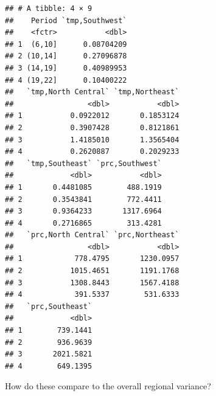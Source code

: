 \documentclass[11pt,]{tufte-handout}
\begin{document}
\begin{verbatim}
## # A tibble: 4 × 9
##    Period `tmp,Southwest`
##    <fctr>           <dbl>
## 1  (6,10]      0.08704209
## 2 (10,14]      0.27096878
## 3 (14,19]      0.40989953
## 4 (19,22]      0.10400222
##   `tmp,North Central` `tmp,Northeast`
##                 <dbl>           <dbl>
## 1           0.0922012       0.1853124
## 2           0.3907428       0.8121861
## 3           1.4185010       1.3565404
## 4           0.2620887       0.2029233
##   `tmp,Southeast` `prc,Southwest`
##             <dbl>           <dbl>
## 1       0.4481085        488.1919
## 2       0.3543841        772.4411
## 3       0.9364233       1317.6964
## 4       0.2716865        313.4281
##   `prc,North Central` `prc,Northeast`
##                 <dbl>           <dbl>
## 1            778.4795       1230.0957
## 2           1015.4651       1191.1768
## 3           1308.8443       1567.4188
## 4            391.5337        531.6333
##   `prc,Southeast`
##             <dbl>
## 1        739.1441
## 2        936.9639
## 3       2021.5821
## 4        649.1395
\end{verbatim}

How do these compare to the overall regional variance?
\end{document}
